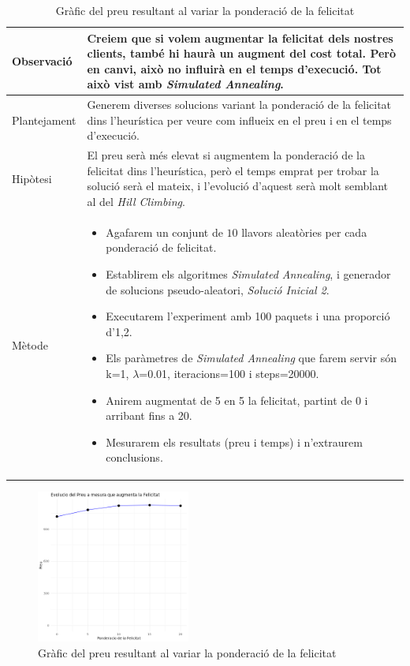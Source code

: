 \documentclass[a4paper]{article}
\begin{document}
\begin{table}[ht]
	\begin{table}[ht]
		\centering
		\begin{tabular}{|l|p{10cm}|}
			\hline
			Observació & Creiem que si volem augmentar la felicitat dels nostres clients, també hi haurà un augment del cost total. Però en canvi, això no influirà en el temps d'execució. Tot això vist amb \textit{Simulated Annealing}. \\
			\hline
			Plantejament & Generem diverses solucions variant la ponderació de la felicitat dins l'heurística per veure com influeix en el preu i en el temps d'execució. \\
			\hline
			Hipòtesi & El preu serà més elevat si augmentem la ponderació de la felicitat dins l'heurística, però el temps emprat per trobar la solució serà el mateix, i l'evolució d'aquest serà molt semblant al del \textit{Hill Climbing}. \\
			\hline
			Mètode & 
			\begin{itemize}
				\item Agafarem un conjunt de $10$ llavors aleatòries per cada ponderació de felicitat.
				\item Establirem els algoritmes \textit{Simulated Annealing}, i generador de solucions pseudo-aleatori, \textit{Solució Inicial 2}.
				\item Executarem l'experiment amb 100 paquets i una proporció d'1,2.
				\item Els paràmetres de \textit{Simulated Annealing} que farem servir són k=1, $\lambda$=0.01, iteracions=100 i steps=20000.
				\item Anirem augmentat de 5 en 5 la felicitat, partint de 0 i arribant fins a 20.
				\item Mesurarem els resultats (preu i temps) i n'extraurem conclusions.
			\end{itemize} \\
			\hline
		\end{tabular}
		\label{tab:exp7_apartats}
	\end{table}
	
	\begin{figure}[H]
		\centering
		\includegraphics[width=0.45\textwidth]{images/exp7_grafic.png}
		\caption{Gràfic del preu resultant al variar la ponderació de la felicitat}
		\label{fig:exp7_grafic}
	\end{figure}
	

\end{table}
\end{document}

